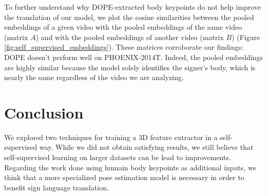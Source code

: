 \documentclass[final]{cvpr}
\begin{document}
To further understand why DOPE-extracted body keypoints do not help improve the translation of our model, we plot the cosine similarities between the pooled embeddings of a given video with the pooled embeddings of the same video (matrix $A$) and with the pooled embeddings of another video (matrix $B$) (Figure \ref{fig:self_supervised_embeddings}). These matrices corroborate our findings: DOPE doesn't perform well on PHOENIX-2014T. Indeed, the pooled embeddings are highly similar because the model solely identifies the signer's body, which is nearly the same regardless of the video we are analyzing.
\section{Conclusion}
We explored two techniques for training a 3D feature extractor in a self-supervised way. While we did not obtain satisfying results, we still believe that self-supervised learning on larger datasets can be lead to improvements. Regarding the work done using humain body keypoints as additional inputs, we think that a more specialized pose estimation model is necessary in order to benefit sign language translation.


{\small


}
\end{document}
